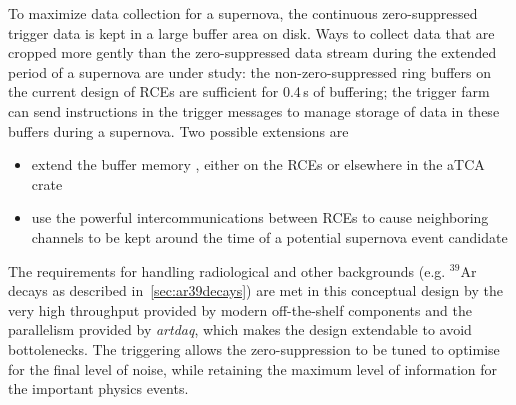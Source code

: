 To maximize data collection for a supernova, the continuous
zero-suppressed trigger data is kept in a large buffer area on disk.
Ways to collect data that are cropped more gently than the zero-suppressed 
data stream during the extended period of a supernova are
under study: the non-zero-suppressed ring buffers on the current
design of RCEs are sufficient for 0.4\,s of buffering; the trigger farm can send
instructions in the trigger messages to manage storage of data in
these buffers during a supernova. Two possible extensions are

\begin{itemize}
\item extend the buffer memory , either on the RCEs or elsewhere in the aTCA crate

\item use the powerful intercommunications between RCEs to cause neighboring
channels to be kept around the time of a potential supernova event candidate

\end{itemize}


\noindent
The requirements for handling radiological and other backgrounds (e.g. $^{39}$Ar decays as described
in~\ref{sec:ar39decays}) are met in this conceptual design by the very high throughput provided by modern
off-the-shelf components  and the parallelism provided by \textit{artdaq}, which makes the design extendable to avoid bottolenecks.  The triggering
allows the zero-suppression to be tuned to optimise for the final
level of noise, while retaining the maximum level of information for
the important physics events.

